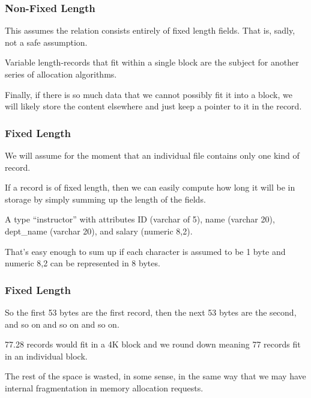 \begin{frame}
\frametitle{Non-Fixed Length}

This assumes the relation consists entirely of fixed length fields. That is, sadly, not a safe assumption.

Variable length-records that fit within a single block are the subject for another series of allocation algorithms. 

Finally, if there is so much data that we cannot possibly fit it into a block, we will likely store the content elsewhere and just keep a pointer to it in the record.


\end{frame}



\begin{frame}
\frametitle{Fixed Length}

We will assume for the moment that an individual file contains only one kind of record. 

If a record is of fixed length, then we can easily compute how long it will be in storage by simply summing up the length of the fields. 

A type ``instructor'' with attributes ID (varchar of 5), name (varchar 20), dept\_name (varchar 20), and salary (numeric 8,2).

That's easy enough to sum up if each character is assumed to be 1 byte and numeric 8,2 can be represented in 8 bytes.

\end{frame}



\begin{frame}
\frametitle{Fixed Length}
So the first 53 bytes are the first record, then the next 53 bytes are the second, and so on and so on and so on. 

77.28 records would fit in a 4K block and we round down meaning 77 records fit in an individual block. 

The rest of the space is wasted, in some sense, in the same way that we may have internal fragmentation in memory allocation requests.

\end{frame}



